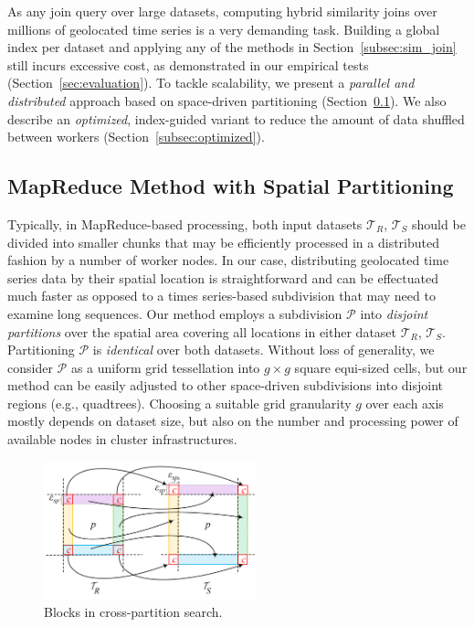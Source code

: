 As any join query over large datasets, computing hybrid similarity joins over millions of geolocated time series is a very demanding task. Building a global index per dataset and applying any of the methods in Section~\ref{subsec:sim_join} still incurs excessive cost, as demonstrated in our empirical tests (Section~\ref{sec:evaluation}). To tackle scalability, we present a {\em parallel and distributed} approach based on space-driven partitioning (Section~\ref{subsec:partitioned}). We also describe an {\em optimized}, index-guided variant to reduce the amount of data shuffled between workers (Section~\ref{subsec:optimized}).

\subsection{MapReduce Method with Spatial Partitioning}
\label{subsec:partitioned}

Typically, in MapReduce-based processing, both input datasets $\mathcal{T}_{R}$, $\mathcal{T}_{S}$ should be divided into smaller chunks that may be efficiently processed in a distributed fashion by a number of worker nodes. In our case, distributing geolocated time series data by their spatial location is straightforward and can be effectuated much faster as opposed to a times series-based subdivision that may need to examine long sequences. Our method employs a subdivision $\mathcal{P}$ into {\em disjoint partitions} over the spatial area covering all locations in either dataset $\mathcal{T}_{R}$, $\mathcal{T}_{S}$. Partitioning $\mathcal{P}$ is {\em identical} over both datasets. Without loss of generality, we consider $\mathcal{P}$ as a uniform grid tessellation into $g \times g$ square equi-sized cells, but our method can be easily adjusted to other space-driven subdivisions into disjoint regions (e.g., quadtrees). Choosing a suitable grid granularity $g$ over each axis mostly depends on dataset size, but also on the number and processing power of available nodes in cluster infrastructures.

\begin{figure}[!tb]
 \centering
 \includegraphics[width=0.55\textwidth]{figures/grid_exchange_slices.png}
 \caption{Blocks in cross-partition search.}
 \label{fig:blocks}
\end{figure}


